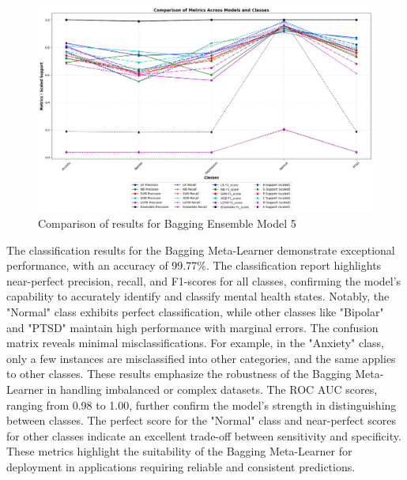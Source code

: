 \begin{figure}[h!]  
    \centering
    \includegraphics[width=1.0\textwidth]{Images/BEM RESULT.png}  
    \caption{Comparison of results for Bagging Ensemble Model 5}
    \label{dfdl1244883}  %
\end{figure}

\pagebreak
\noindent
The classification results for the Bagging Meta-Learner demonstrate exceptional performance, with an accuracy of 99.77\%. The classification report highlights near-perfect precision, recall, and F1-scores for all classes, confirming the model's capability to accurately identify and classify mental health states. Notably, the "Normal" class exhibits perfect classification, while other classes like "Bipolar" and "PTSD" maintain high performance with marginal errors. The confusion matrix reveals minimal misclassifications. For example, in the "Anxiety" class, only a few instances are misclassified into other categories, and the same applies to other classes. These results emphasize the robustness of the Bagging Meta-Learner in handling imbalanced or complex datasets. The ROC AUC scores, ranging from 0.98 to 1.00, further confirm the model's strength in distinguishing between classes. The perfect score for the "Normal" class and near-perfect scores for other classes indicate an excellent trade-off between sensitivity and specificity. These metrics highlight the suitability of the Bagging Meta-Learner for deployment in applications requiring reliable and consistent predictions.

\vspace{1em}

